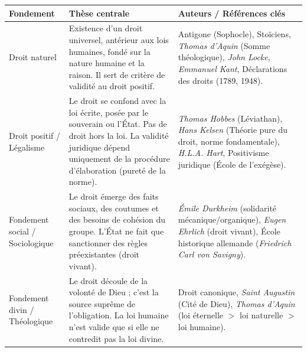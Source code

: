 \documentclass[11pt]{article}
\newcommand{\cle}[1]{{\popxbold\color{popdark}#1}}
\begin{document}
\begin{propriete}
\begin{center}
\begin{tabularx}{\linewidth}{|l|X|X|}\hline
\rowcolor{popblueL}
\textbf{Fondement} & \textbf{Thèse centrale} & \textbf{Auteurs / Références clés} \\ \hline
\cle{Droit naturel} & Existence d'un droit universel, antérieur aux lois humaines, fondé sur la nature humaine et la raison. Il sert de critère de validité au droit positif. & Antigone (Sophocle), Stoïciens, \emph{Thomas d'Aquin} (Somme théologique), \emph{John Locke}, \emph{Emmanuel Kant}, Déclarations des droits (1789, 1948). \\ \hline
\cle{Droit positif / Légalisme} & Le droit se confond avec la loi écrite, posée par le souverain ou l'État. Pas de droit hors la loi. La validité juridique dépend uniquement de la procédure d'élaboration (pureté de la norme). & \emph{Thomas Hobbes} (Léviathan), \emph{Hans Kelsen} (Théorie pure du droit, norme fondamentale), \emph{H.L.A. Hart}, Positivisme juridique (École de l'exégèse). \\ \hline
\cle{Fondement social / Sociologique} & Le droit émerge des faits sociaux, des coutumes et des besoins de cohésion du groupe. L'État ne fait que sanctionner des règles préexistantes (droit vivant). & \emph{Émile Durkheim} (solidarité mécanique/organique), \emph{Eugen Ehrlich} (droit vivant), École historique allemande (\emph{Friedrich Carl von Savigny}). \\ \hline
\cle{Fondement divin / Théologique} & Le droit découle de la volonté de Dieu ; c'est la source suprême de l'obligation. La loi humaine n'est valide que si elle ne contredit pas la loi divine. & Droit canonique, \emph{Saint Augustin} (Cité de Dieu), \emph{Thomas d'Aquin} (loi éternelle $>$ loi naturelle $>$ loi humaine). \\ \hline
\end{tabularx}
\end{center}
\end{propriete}
\end{document}
